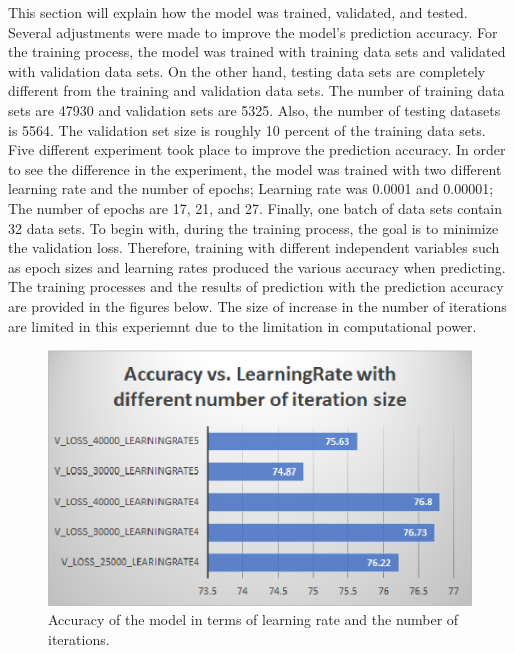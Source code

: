 This section will explain how the model was trained, validated, and tested. Several adjustments were
made to improve the model's prediction accuracy. For the training process, the model was trained with
training data sets and validated with validation data sets. On the other hand, testing data sets are
completely different from the training and validation data sets.
The number of training data sets are 47930 and validation sets are 5325. Also, the number of testing
datasets is 5564. The validation set size is
roughly 10 percent of the training data sets. Five different experiment took place to improve the
prediction accuracy. In order to see the difference in the experiment, the model was trained with two
different learning rate and the number of epochs; Learning rate was 0.0001 and 0.00001; The number of
epochs are 17, 21, and 27. Finally, one batch of data sets contain 32 data sets.
\newline
\newline
\indent
To begin with, during the training process, the goal is to minimize the validation loss. Therefore,
training with different independent variables such as epoch sizes and learning rates produced the various
accuracy when predicting. The training processes and the results of prediction with the prediction accuracy are
provided in the figures below. The size of increase in the number of iterations are limited in this experiemnt
due to the  limitation in computational power.
\newline

    \begin{figure}
        \includegraphics[width=\textwidth, scale=0.25]{val_acc.eps}
        \caption{Accuracy of the model in terms of learning rate and the number of iterations.}
        \label{Figure2}
    \end{figure}


